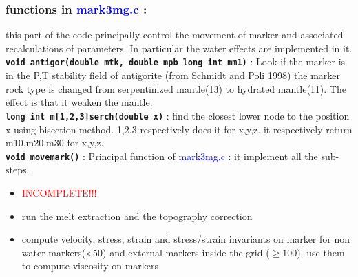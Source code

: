 \subsubsection*{functions in \textcolor{blue}{mark3mg.c} :}
this part of the code principally control the movement of marker and associated recalculations of parameters. In particular the water effects are implemented in it.
\\
\textbf{\texttt{void antigor(double mtk, double mpb long int mm1)}} : Look if the marker is in the P,T stability field of antigorite (from Schmidt and Poli 1998) the marker rock type is changed from serpentinized mantle(13) to hydrated mantle(11). The effect is that it weaken the mantle.
\\
\textbf{\texttt{long int m[1,2,3]serch(double x)}} : find the closest lower node to the position x using bisection method. 1,2,3 respectively does it for x,y,z. it respectively return m10,m20,m30 for x,y,z. 
\\
\textbf{\texttt{void movemark()}} : Principal function of \textcolor{blue}{mark3mg.c :} it implement all the sub-steps.
                                  \begin{itemize}
                                   \item \textcolor{red}{INCOMPLETE!!!}
                                   \item run the melt extraction and the topography correction
                                   \item compute velocity, stress, strain and stress/strain invariants on marker for non water markers(<50) and external markers inside the grid ($\geq 100$).
                                   use them to compute viscosity on markers
                                  \end{itemize}
                                  
